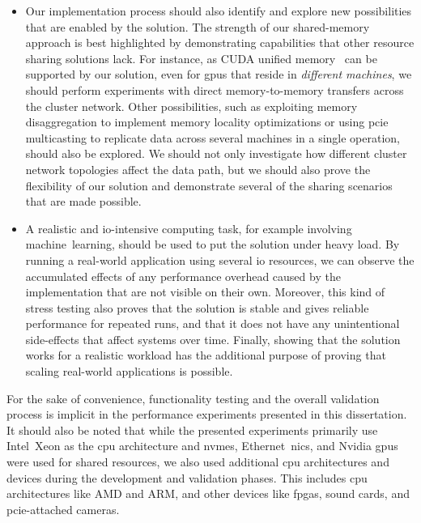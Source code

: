 \begin{itemize}
    \item 
        Our implementation process should also identify and explore new possibilities that are enabled by the solution.
        The strength of our shared-memory approach is best highlighted by demonstrating capabilities that other resource sharing solutions lack.
        For instance, as CUDA unified memory~\cite{url:unified-memory} can be supported by our solution, even for \glspl{gpu} that reside in \emph{different machines}, we should perform experiments with direct memory-to-memory transfers across the cluster network.
        Other possibilities, such as exploiting memory \gls{disaggregation} to implement memory locality optimizations or using \gls{pcie} \gls{multicasting} to replicate data across several machines in a single operation, should also be explored.
        We should not only investigate how different cluster network topologies affect the data path, but we should also prove the flexibility of our solution and demonstrate several of the sharing scenarios that are made possible.

    \item
        A realistic and \gls{io}-intensive computing task, for example involving machine~learning, should be used to put the solution under heavy load.
        By running a real-world application using several \gls{io} resources, we can observe the accumulated effects of any performance overhead caused by the implementation that are not visible on their own.
        Moreover, this kind of stress testing also proves that the solution is stable and gives reliable performance for repeated runs, and that it does not have any unintentional side-effects that affect systems over time.
        Finally, showing that the solution works for a realistic workload has the additional purpose of proving that scaling real-world applications is possible.

\end{itemize}
%
For the sake of convenience, functionality testing and the overall validation process is implicit in the performance experiments presented in this dissertation.
%
It should also be noted that while the presented experiments primarily use Intel~Xeon as the \gls{cpu} architecture and \glspl{nvme}, Ethernet~\glspl{nic}, and Nvidia \glspl{gpu} were used for shared resources, we also used additional \gls{cpu} architectures and devices during the development and validation phases.
%
This includes \gls{cpu} architectures like AMD and ARM, and other devices like \glspl{fpga}, sound cards, and \gls{pcie}-attached cameras.


